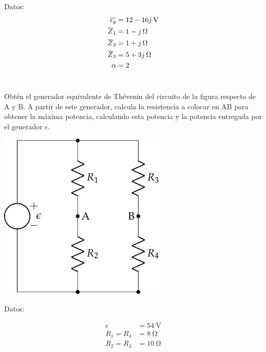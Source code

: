 \documentclass[12pt]{article}
\begin{document}
Datos:
\begin{align*}
  \overline{\epsilon_g} &= \SI[parse-numbers=false]{12 - 16j}{\volt}\\
  \overline{Z}_1 &= \SI[parse-numbers=false]{1 - j}{\ohm}\\
  \overline{Z}_2 &= \SI[parse-numbers=false]{1 + j}{\ohm}\\
  \overline{Z}_3 &= \SI[parse-numbers=false]{5 + 3j}{\ohm}\\
  \alpha &= 2
\end{align*}

\noindent\hrulefill

\clearpage

\section{}

Obtén el generador equivalente de Thévenin del circuito de la figura respecto de A y B. A partir de este generador, calcula la resistencia a colocar en AB para obtener la máxima potencia, calculando esta potencia y la potencia entregada por el generador $\epsilon$.

\begin{center}
\includegraphics{figs/Thevenin2}
\end{center}

Datos:

\begin{align*}
  \epsilon &= \SI{54}{\volt}\\
  R_1 = R_4 &= \SI{8}{\ohm}\\
  R_2 = R_3 &= \SI{10}{\ohm}
\end{align*}

\noindent\hrulefill

\clearpage
\end{document}
